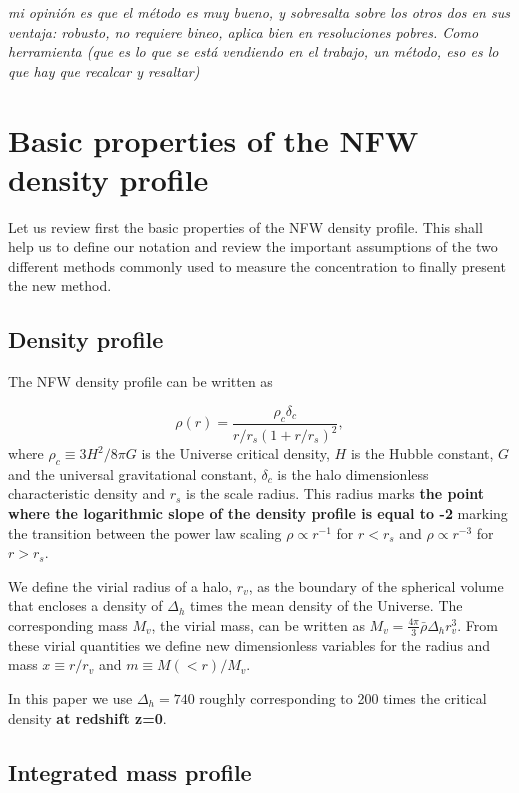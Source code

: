 \documentclass[a4,useAMS,usenatbib,usegraphicx]{mn2e}
\begin{document}
{\it mi opinión es que el método es muy bueno, y sobresalta sobre los
  otros dos en sus ventaja: robusto, no requiere bineo, aplica bien en
  resoluciones pobres. Como herramienta (que es lo que se está
  vendiendo en el trabajo, un método, eso es lo que hay que recalcar y
  resaltar)}

\section{Basic properties of the NFW density profile}
\label{sec:basics}

Let us review first the basic properties of the NFW density profile.
This shall help us to define our notation and review the important
assumptions of the two different methods commonly used to measure the
concentration to finally present the new method.

\subsection{Density profile}

The NFW density profile can be written as

\begin{equation}
\rho(r) = \frac{\rho_c\delta_c}{r/r_s(1+r/r_s)^2},
\label{eq:definition}
\end{equation}
%
where $\rho_c\equiv 3H^2/8\pi G$ is the Universe critical density, $H$
is the Hubble constant, $G$ and the universal gravitational constant,
$\delta_c$ is the halo dimensionless characteristic density and $r_s$
is the scale radius. This radius marks {\bf the point where the
  logarithmic slope of the density profile is equal to -2} marking the
transition between the power law scaling $\rho\propto r^{-1}$ for
$r<r_s$ and $\rho\propto r^{-3}$ for $r>r_s$.

We define the virial radius of a halo, $r_v$, as the boundary of the
spherical volume that encloses a density of $\Delta_h$ times the mean
density of the Universe.  The corresponding mass $M_{v}$, the virial
mass, can be written as $M_{v} = \frac{4\pi}{3}\bar{\rho}\Delta_h
r_v^3$.  From these virial quantities we define new dimensionless
variables for the radius and mass $x\equiv r/r_v$ and $m\equiv
M(<r)/M_v$.

In this paper we use $\Delta_h=740$ roughly corresponding to 200 times
the critical density {\bf at redshift z=0}.


\subsection{Integrated mass profile}
\end{document}
